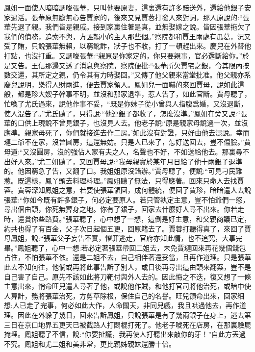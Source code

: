 \begin{parag}
    鳳姐一面使人暗暗調唆張華，只叫他要原妻，這裏還有許多賠送外，還給他銀子安家過活。張華原無膽無心告賈家的，後來又見賈蓉打發人來對詞，那人原說的:“張華先退了親。我們皆是親戚。接到家裏住著是真，並無娶嫁之說。皆因張華拖欠了我們的債務，追索不與，方誣賴小的主人那些個。”察院都和賈王兩處有瓜葛，況又受了賄，只說張華無賴，以窮訛詐，狀子也不收，打了一頓趕出來。慶兒在外替他打點，也沒打重。又調唆張華:“親原是你家定的，你只要親事，官必還斷給你。”於是又告。王信那邊又透了消息與察院，察院便批:“張華所欠賈宅之銀，令其限內按數交還，其所定之親，仍令其有力時娶回。”又傳了他父親來當堂批准。他父親亦系慶兒說明，樂得人財兩進，便去賈家領人。鳳姐兒一面嚇的來回賈母，說如此這般，都是珍大嫂子幹事不明，並沒和那家退準，惹人告了，如此官斷。賈母聽了，忙喚了尤氏過來，說他作事不妥，“既是你妹子從小曾與人指腹爲婚，又沒退斷，使人混告了。”尤氏聽了，只得說:“他連銀子都收了，怎麼沒準。”鳳姐在旁又說:“張華的口供上現說不曾見銀子，也沒見人去。他老子說:‘原是親家母說過一次，並沒應準。親家母死了，你們就接進去作二房。’如此沒有對證，只好由他去混說。幸而璉二爺不在家，沒曾圓房，這還無妨。只是人已來了，怎好送回去，豈不傷臉。”賈母道:“又沒圓房，沒的強佔人家有夫之人，名聲也不好，不如送給他去。那裏尋不出好人來。”尤二姐聽了，又回賈母說:“我母親實於某年月日給了他十兩銀子退準的。他因窮急了告，又翻了口。我姐姐原沒錯辦。”賈母聽了，便說:“可見刁民難惹。既這樣，鳳丫頭去料理料理。”鳳姐聽了無法，只得應著。回來只命人去找賈蓉。賈蓉深知鳳姐之意，若要使張華領回，成何體統，便回了賈珍，暗暗遣人去說張華:“你如今既有許多銀子，何必定要原人。若只管執定主意，豈不怕爺們一怒，尋出個由頭，你死無葬身之地。你有了銀子，回家去什麼好人尋不出來。你若走時，還賞你些路費。”張華聽了，心中想了一想，這倒是好主意，和父親商議已定，約共也得了有百金，父子次日起個五更，回原籍去了。賈蓉打聽得真了，來回了賈母鳳姐，說:“張華父子妄告不實，懼罪逃走，官府亦知此情，也不追究，大事完畢。”鳳姐聽了，心中一想:若必定著張華帶回二姐去，未免賈璉回來再花幾個錢包占住，不怕張華不依。還是二姐不去，自己相伴著還妥當，且再作道理。只是張華此去不知何往，他倘或再將此事告訴了別人，或日後再尋出這由頭來翻案，豈不是自己害了自己。原先不該如此將刀靶付與外人去的。因此悔之不迭，復又想了一條主意出來，悄命旺兒遣人尋著了他，或說他作賊，和他打官司將他治死，或暗中使人算計，務將張華治死，方剪草除根，保住自己的名譽。旺兒領命出來，回家細想:人已走了完事，何必如此大作，人命關天，非同兒戲，我且哄過他去，再作道理。因此在外躲了幾日，回來告訴鳳姐，只說張華是有了幾兩銀子在身上，逃去第三日在京口地界五更天已被截路人打悶棍打死了。他老子唬死在店房，在那裏驗屍掩埋。鳳姐聽了不信，說:“你要扯謊，我再使人打聽出來敲你的牙！”自此方丟過不究。鳳姐和尤二姐和美非常，更比親姊親妹還勝十倍。
\end{parag}


